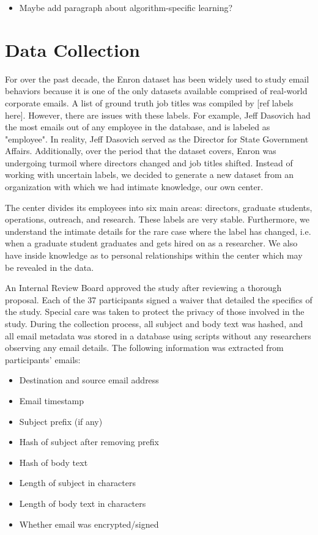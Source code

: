 \documentclass{article}
\begin{document}
\begin{itemize}
\item Maybe add paragraph about algorithm-specific learning?
\end{itemize}

\section{Data Collection} \label{Data Collection}
For over the past decade, the Enron dataset has been widely used to study email behaviors because it is one of the only datasets available comprised of real-world corporate emails.  A list of ground truth job titles was compiled by [ref labels here].  However, there are issues with these labels.  For example, Jeff Dasovich had the most emails out of any employee in the database, and is labeled as "employee".  In reality, Jeff Dasovich served as the Director for State Government Affairs. Additionally, over the period that the dataset covers, Enron was undergoing turmoil where directors changed and job titles shifted.  Instead of working with uncertain labels, we decided to generate a new dataset from an organization with which we had intimate knowledge, our own center.  
\par
The center divides its employees into six main areas: directors, graduate students, operations, outreach, and research.  These labels are very stable.  Furthermore, we understand the intimate details for the rare case where the label has changed, i.e. when a graduate student graduates and gets hired on as a researcher. We also have inside knowledge as to personal relationships within the center which may be revealed in the data.
\par 
An Internal Review Board approved the study after reviewing a thorough proposal.  Each of the 37 participants signed a waiver that detailed the specifics of the study.  Special care was taken to protect the privacy of those involved in the study.  During the collection process, all subject and body text was hashed, and all email  metadata was stored in a database using scripts without any researchers observing any email details.  The following information was extracted from participants' emails:  
\begin{itemize}
\item Destination and source email address
\item Email timestamp
\item Subject prefix (if any)
\item Hash of subject after removing prefix
\item Hash of body text
\item Length of subject in characters
\item Length of body text in characters
\item Whether email was encrypted/signed
\end{itemize}
\end{document}
